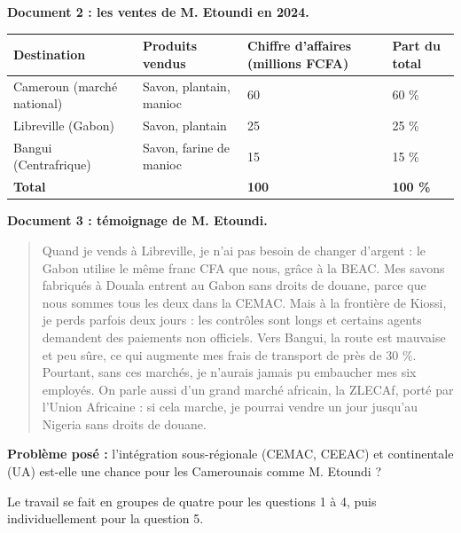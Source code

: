 \documentclass[11pt]{article}
\newcounter{popsec}
\newcounter{popsub}
\newcommand{\courssub}[1]{%
  \stepcounter{popsub}%
  \par\vspace{9pt}\noindent{\popxbold\fontsize{11.5}{13}\selectfont\color{popink}{\color{poporange}\thepopsec.\thepopsub}\hspace{6pt}#1}\par\nopagebreak\vspace{4pt}
}
\begin{document}
\textbf{Document 2 : les ventes de M. Etoundi en 2024.}

\begin{center}
\begin{tabularx}{\linewidth}{|l|X|X|X|}
\hline
\rowcolor{popblueL} \textbf{Destination} & \textbf{Produits vendus} & \textbf{Chiffre d'affaires (millions FCFA)} & \textbf{Part du total} \\
\hline
Cameroun (marché national) & Savon, plantain, manioc & 60 & 60 \% \\
\hline
Libreville (Gabon) & Savon, plantain & 25 & 25 \% \\
\hline
Bangui (Centrafrique) & Savon, farine de manioc & 15 & 15 \% \\
\hline
\textbf{Total} & & \textbf{100} & \textbf{100 \%} \\
\hline
\end{tabularx}
\end{center}

\textbf{Document 3 : témoignage de M. Etoundi.}

\begin{quote}
\og Quand je vends à Libreville, je n'ai pas besoin de changer d'argent : le Gabon utilise le même franc CFA que nous, grâce à la BEAC. Mes savons fabriqués à Douala entrent au Gabon sans droits de douane, parce que nous sommes tous les deux dans la CEMAC. Mais à la frontière de Kiossi, je perds parfois deux jours : les contrôles sont longs et certains agents demandent des paiements non officiels. Vers Bangui, la route est mauvaise et peu sûre, ce qui augmente mes frais de transport de près de 30 \%. Pourtant, sans ces marchés, je n'aurais jamais pu embaucher mes six employés. On parle aussi d'un grand marché africain, la ZLECAf, porté par l'Union Africaine : si cela marche, je pourrai vendre un jour jusqu'au Nigeria sans droits de douane. \fg
\end{quote}

\textbf{Problème posé :} l'intégration sous-régionale (CEMAC, CEEAC) et continentale (UA) est-elle une chance pour les Camerounais comme M. Etoundi ?

\courssub{Consignes}

Le travail se fait en groupes de quatre pour les questions 1 à 4, puis individuellement pour la question 5.
\end{document}
